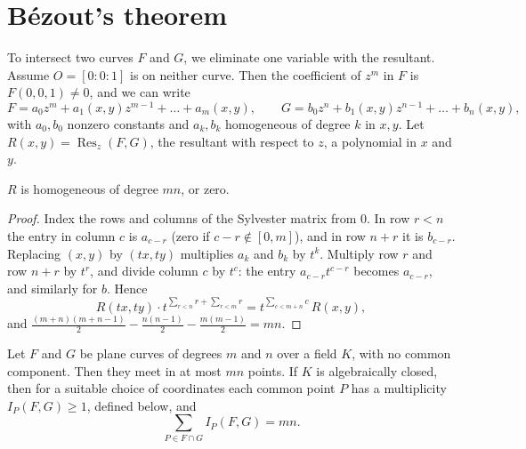 \section{B\'ezout's theorem}

To intersect two curves $F$ and $G$, we eliminate one variable with the resultant. Assume $O=[0:0:1]$ is on neither curve. Then the coefficient of
$z^m$ in $F$ is $F(0,0,1)\ne0$, and we can write
\[
F=a_0z^m+a_1(x,y)z^{m-1}+\dots+a_m(x,y),\qquad G=b_0z^n+b_1(x,y)z^{n-1}+\dots+b_n(x,y),
\]
with $a_0,b_0$ nonzero constants and $a_k,b_k$ homogeneous of degree $k$ in $x,y$. Let $R(x,y)=\operatorname{Res}_z(F,G)$, the resultant with
respect to $z$, a polynomial in $x$ and $y$.

\begin{lemma}\label{geometry:lem:reshomog}
$R$ is homogeneous of degree $mn$, or zero.
\end{lemma}

\begin{proof}
Index the rows and columns of the Sylvester matrix from $0$. In row $r<n$ the entry in column $c$ is $a_{c-r}$ (zero if $c-r\notin[0,m]$), and in row
$n+r$ it is $b_{c-r}$. Replacing $(x,y)$ by $(tx,ty)$ multiplies $a_k$ and $b_k$ by $t^k$. Multiply row $r$ and row $n+r$ by $t^r$, and divide column $c$
by $t^c$: the entry $a_{c-r}t^{c-r}$ becomes $a_{c-r}$, and similarly for $b$. Hence
\[
R(tx,ty)\cdot t^{\sum_{r<n}r+\sum_{r<m}r}=t^{\sum_{c<m+n}c}\,R(x,y),
\]
and $\frac{(m+n)(m+n-1)}2-\frac{n(n-1)}2-\frac{m(m-1)}2=mn$.
\end{proof}

\begin{theorem}[B\'ezout]\label{geometry:thm:bezout}
Let $F$ and $G$ be plane curves of degrees $m$ and $n$ over a field $K$, with no common component. Then they meet in at most $mn$ points.
If $K$ is algebraically closed, then for a suitable choice of coordinates each common point $P$ has a multiplicity $I_P(F,G)\ge1$, defined below, and
\[
\sum_{P\in F\cap G}I_P(F,G)=mn.
\]
\end{theorem}

